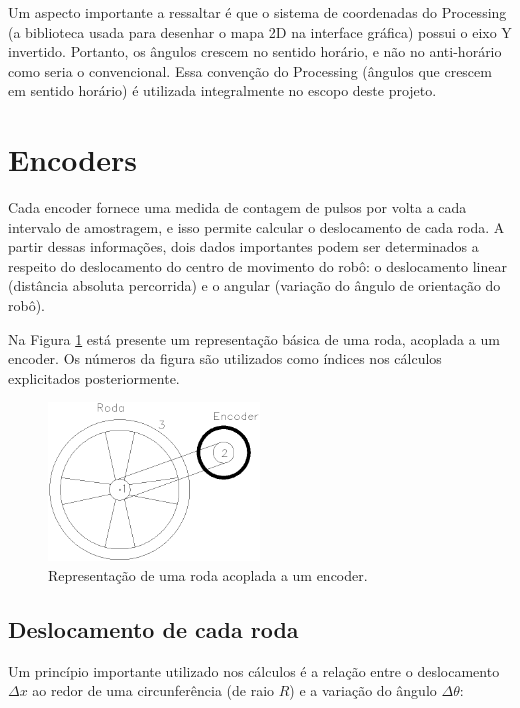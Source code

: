 Um aspecto importante a ressaltar é que o sistema de coordenadas do Processing (a biblioteca usada para desenhar o mapa 2D na interface gráfica) possui o eixo Y invertido. Portanto, os ângulos crescem no sentido horário, e não no anti-horário como seria o convencional. Essa convenção do Processing (ângulos que crescem em sentido horário) é utilizada integralmente no escopo deste projeto.

\section{Encoders}

Cada encoder fornece uma medida de contagem de pulsos por volta a cada intervalo de amostragem, e isso permite calcular o deslocamento de cada roda. A partir dessas informações, dois dados importantes podem ser determinados a respeito do deslocamento do centro de movimento do robô: o deslocamento linear (distância absoluta percorrida) e o angular (variação do ângulo de orientação do robô).

Na Figura \ref{fig:roda_encoder} está presente um representação básica de uma roda, acoplada a um encoder. Os números da figura são utilizados como índices nos cálculos explicitados posteriormente.

\begin{figure}[H]
  \centering
  \includegraphics[width=0.5\textwidth, keepaspectratio]{./figuras/robo/roda_encoder.png}
  \caption{Representação de uma roda acoplada a um encoder.}
  \label{fig:roda_encoder}
\end{figure}

\subsection{Deslocamento de cada roda}

Um princípio importante utilizado nos cálculos é a relação entre o deslocamento $\Delta x$ ao redor de uma circunferência (de raio $R$) e a variação do ângulo $\Delta \theta$:

